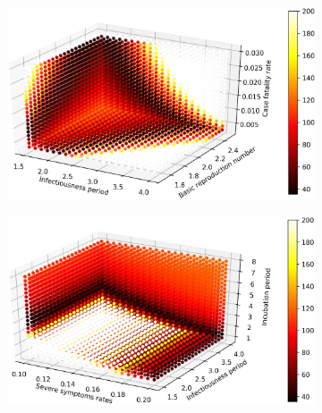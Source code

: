 \documentclass[11pt]{article}
\begin{document}
\begin{figure}[H]
    \centering
    \begin{subfigure}{0.49\textwidth}
        \centering
        \includegraphics[width=\linewidth]{figs/30-04-2020/2020-5-3_D_infectious_R0_CFR.pdf}
    \end{subfigure}
    \hfill
    \begin{subfigure}{0.49\textwidth}
        \centering
        \includegraphics[width=\linewidth]{figs/30-04-2020/2020-5-3_P_SEVERE_D_infectious_D_incbation.pdf}
    \end{subfigure}
    
    \vspace{0.5cm} %
    

\end{figure}
\end{document}
